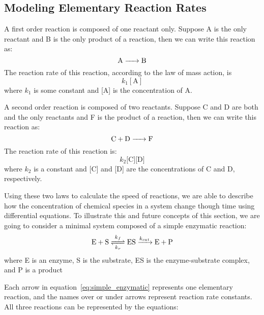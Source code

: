\subsection{Modeling Elementary Reaction Rates}
A first order reaction is composed of one reactant only. Suppose A is 
the only reactant and B is the only product of a reaction, then we can
write this reaction as:
\begin{equation*}
\ce{
    A -> B
}
\end{equation*}
The reaction rate of this reaction, according to the law of mass 
action, is 
\begin{equation*}
    k_1[\text{A}]
\end{equation*}
where $k_1$ is some constant and [A] is the concentration of A. 

A second order reaction is composed of two reactants. Suppose C and D 
are both and the only reactants and F is the product of a reaction, then
we can write this reaction as:
\begin{equation*}
\ce{
    C + D -> F
}
\end{equation*}
The reaction rate of this reaction is:
\begin{equation*}
    k_2\text{[C][D]}
\end{equation*}
where $k_2$ is a constant and [C] and [D] are the concentrations of C 
and D, respectively.

Using these two laws to calculate the speed of reactions, we are able 
to describe how the concentration of chemical species in a system change 
though time using differential equations. To illustrate this and future 
concepts of this section, we are going to consider a minimal system 
composed of a simple enzymatic reaction:
\begin{equation}
\ce{
    E + S <=>[\ce{$k$_f}][\ce{$k$_r}] ES ->[\ce{$k_{cat}$}] E + P
}
\label{eq:simple_enzymatic}
\end{equation}
where E is an enzyme, S is the substrate, ES is the enzyme-substrate
complex, and P is a product

Each arrow in equation~\ref{eq:simple_enzymatic} represents one 
elementary reaction, and the names over or under arrows represent 
reaction rate constants. All three reactions can be represented by the
equations:

